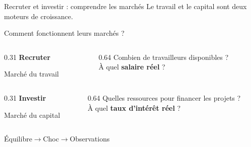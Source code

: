 \documentclass[aspectratio=169]{beamer}
\begin{document}
\begin{frame}{Recruter et investir : comprendre les marchés}
   \normalsize\RaggedRight Le travail et le capital sont deux moteurs de croissance. \\
   \par\vspace{0.1cm}
   Comment fonctionnent leurs marchés ?
   \par\vspace{0.2cm}
   \begin{tcolorbox}[colback=HEClightgray, colframe=HEClightgray, boxrule=0pt, arc=8pt, left=10pt, right=10pt, top=10pt, bottom=10pt]
      \begin{columns}[c,onlytextwidth]
         \begin{column}{0.31\textwidth}
            \RaggedRight
            {\Large\textbf{\textcolor{HECnavy}{Recruter}}}\par\vspace{4pt}
            {\footnotesize Marché du travail}
         \end{column}
         \begin{column}{0.64\textwidth}
            \RaggedRight\small
            Combien de travailleurs disponibles ?\\[5pt]
            À quel \textbf{salaire réel} ?
         \end{column}
      \end{columns}
   \end{tcolorbox}
   \vspace{0.15cm}
   \begin{tcolorbox}[colback=HECgreen!7, colframe=HECgreen!7, boxrule=0pt, arc=8pt, left=10pt, right=10pt, top=10pt, bottom=10pt]
      \begin{columns}[c,onlytextwidth]
         \begin{column}{0.31\textwidth}
            \RaggedRight
            {\Large\textbf{\textcolor{HECgreen}{Investir}}}\par\vspace{4pt}
            {\footnotesize Marché du capital}
         \end{column}
         \begin{column}{0.64\textwidth}
            \RaggedRight\small
            Quelles ressources pour financer les projets ?\\[5pt]
            À quel \textbf{taux d'intérêt réel} ?
         \end{column}
      \end{columns}
   \end{tcolorbox}
   \vspace{0.25cm}
   \centering\small\textcolor{HECnavy}{Équilibre}\quad$\longrightarrow$\quad\textcolor{HECnavy}{Choc}\quad$\longrightarrow$\quad\textcolor{HECnavy}{Observations}
\end{frame}
\end{document}
